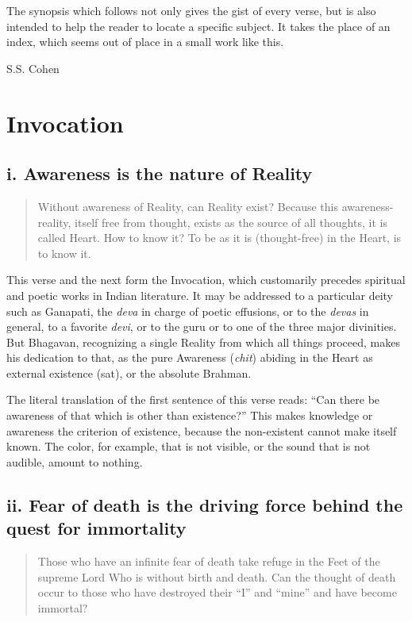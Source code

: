 \documentclass[12pt]{report}
\begin{document}
The synopsis which follows not only gives the gist of every verse, but
is also intended to help the reader to locate a specific subject. It
takes the place of an index, which seems out of place in a small work
like this.

S.S. Cohen

\chapter{Invocation}

\section{i. Awareness is the nature of Reality}

\begin{quote}
  Without awareness of Reality, can Reality exist? Because this
  awareness-reality, itself free from thought, exists as the source of
  all thoughts, it is called Heart. How to know it? To be as it is
  (thought-free) in the Heart, is to know it.
\end{quote}

This verse and the next form the Invocation, which customarily
precedes spiritual and poetic works in Indian literature. It may be
addressed to a particular deity such as Ganapati, the \emph{deva} in
charge of poetic effusions, or to the \emph{devas} in general, to a
favorite \emph{devi}, or to the guru or to one of the three major
divinities. But Bhagavan, recognizing a single Reality from which all
things proceed, makes his dedication to that, as the pure Awareness
(\emph{chit}) abiding in the Heart as external existence (sat), or the
absolute Brahman.

The literal translation of the first sentence of this verse reads:
``Can there be awareness of that which is other than existence?'' This
makes knowledge or awareness the criterion of existence, because the
non-existent cannot make itself known. The color, for example, that is
not visible, or the sound that is not audible, amount to nothing.

\section{ii. Fear of death is the driving force behind the quest for immortality}

\begin{quote}
  Those who have an infinite fear of death take refuge in the Feet of
  the supreme Lord Who is without birth and death. Can the thought of
  death occur to those who have destroyed their ``I'' and ``mine'' and
  have become immortal?
\end{quote}
\end{document}
